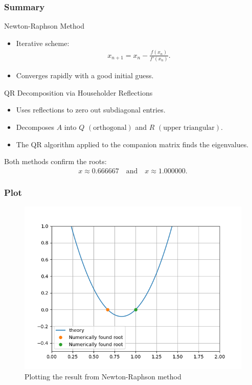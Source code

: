 \documentclass{beamer}
\providecommand{\brak}[1]{\ensuremath{\left(#1\right)}}
\theoremstyle{remark}
\numberwithin{equation}{section}
\begin{document}
\begin{frame}
\frametitle{Summary}
\begin{block}{Newton-Raphson Method}
	\begin{itemize}
		\item Iterative scheme:
		\begin{align}
		x_{n+1} = x_n - \frac{f\brak{x_n}}{f'\brak{x_n}}.
		\end{align}
		\item Converges rapidly with a good initial guess.
	\end{itemize}
\end{block}

\begin{block}{QR Decomposition via Householder Reflections}
	\begin{itemize}
		\item Uses reflections to zero out subdiagonal entries.
    \item Decomposes $A$ into $Q$ \brak{\text{orthogonal}} and $R$ \brak{\text{upper triangular}}.
		\item The QR algorithm applied to the companion matrix finds the eigenvalues.
	\end{itemize}
\end{block}
Both methods confirm the roots:
\begin{align}
x \approx 0.666667 \quad \text{and} \quad x \approx 1.000000.
\end{align}
\end{frame}

\begin{frame}
  \frametitle{Plot}
  \begin{figure}
    \centering
    \includegraphics[width=0.8\columnwidth]{figs/fig.png}
    \caption{Plotting the result from Newton-Raphson method}
  \end{figure}
\end{frame}
\end{document}

